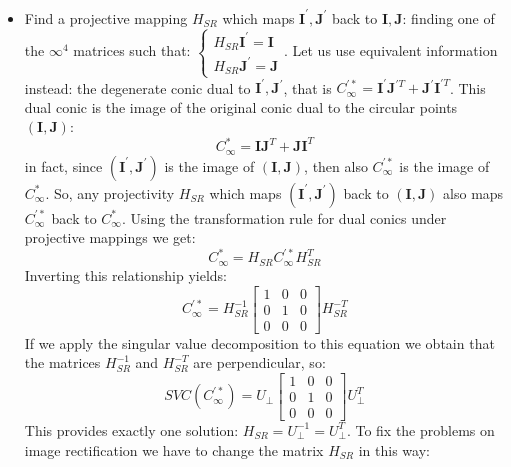\documentclass[12pt, a4paper]{report}
\begin{document}
    \begin{itemize}
        \item Find a projective mapping $H_{SR}$ which maps $\boldsymbol{I}^{'},\boldsymbol{J}^{'}$ back to 
            $\boldsymbol{I},\boldsymbol{J}$: finding one of the $\infty^{4}$ matrices such that: 
            $\begin{cases}
                H_{SR}\boldsymbol{I}^{'}=\boldsymbol{I} \\
                H_{SR}\boldsymbol{J}^{'}=\boldsymbol{J}
            \end{cases}$. Let us use equivalent information instead: the degenerate conic dual to $\boldsymbol{I}^{'},\boldsymbol{J}^{'}$, 
            that is $C_{\infty}^{'*}=\boldsymbol{I}^{'}\boldsymbol{J}^{'T}+\boldsymbol{J}^{'}\boldsymbol{I}^{'T}$. This dual conic is the 
            image of the original conic dual to the circular points $(\boldsymbol{I},\boldsymbol{J})$: 
            \[C_{\infty}^{*}=\boldsymbol{I}\boldsymbol{J}^{T}+\boldsymbol{J}\boldsymbol{I}^{T}\]
            in fact, since $(\boldsymbol{I}^{'},\boldsymbol{J}^{'})$ is the image of $(\boldsymbol{I},\boldsymbol{J})$, then also 
            $C_{\infty}^{'*}$ is the image of $C_{\infty}^{*}$. So, any projectivity $H_{SR}$ which maps $(\boldsymbol{I}^{'},\boldsymbol{J}^{'})$
            back to $(\boldsymbol{I},\boldsymbol{J})$ also maps $C_{\infty}^{'*}$ back to $C_{\infty}^{*}$. Using the transformation rule for dual 
            conics under projective mappings we get: 
            \[C^{*}_{\infty}=H_{SR}C^{'*}_{\infty}H_{SR}^T\]
            Inverting this relationship yields: 
            \[C_{\infty}^{'*}=H_{SR}^{-1} 
            \begin{bmatrix}
                1 & 0 & 0 \\
                0 & 1 & 0 \\
                0 & 0 & 0
            \end{bmatrix}
            H_{SR}^{-T}\]
            If we apply the singular value decomposition to this equation we obtain that the matrices $H_{SR}^{-1}$ and $H_{SR}^{-T}$ are
            perpendicular, so: 
            \[SVC(C_{\infty}^{'*})=U_\perp
            \begin{bmatrix}
                1 & 0 & 0 \\
                0 & 1 & 0 \\
                0 & 0 & 0
            \end{bmatrix}
            U_{\perp}^T\]
            This provides exactly one solution: $H_{SR}=U_{\perp}^{-1}=U_{\perp}^T$. To fix the problems on image rectification we have to change the matrix $H_{SR}$ in this way: 

\end{itemize}
\end{document}
